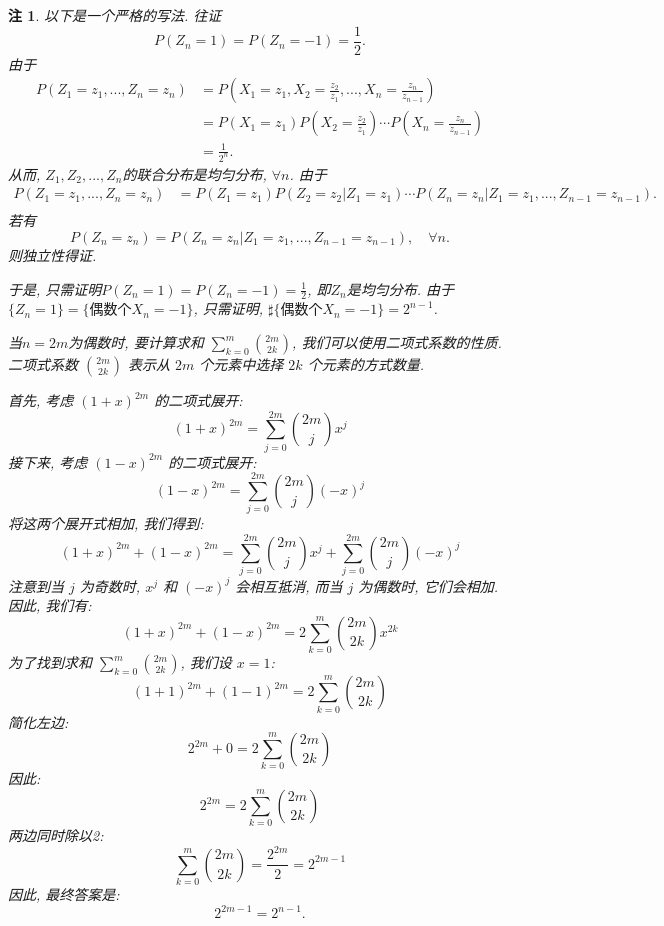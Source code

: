 \documentclass[UTF8, a4paper]{article}
\newtheorem*{remark}{注}
\begin{document}
\begin{remark}
以下是一个严格的写法. 往证
$$
P(Z_n = 1) = P(Z_n = -1) = \frac{1}{2}.
$$
由于
\begin{align*}
P(Z_1 = z_1, ..., Z_n = z_n) &= P\left(X_1 = z_1, X_2 = \frac{z_2}{z_1}, ..., X_n = \frac{z_n}{z_{n-1}}\right) \\
&= P(X_1 = z_1) P\left(X_2 = \frac{z_2}{z_1}\right) \cdots P\left(X_n = \frac{z_n}{z_{n-1}}\right) \\
&= \frac{1}{2^n}.
\end{align*}
从而, \(Z_1, Z_2, ..., Z_n\)的联合分布是均匀分布, \(\forall n\).
由于 
\begin{align*}
P(Z_1 = z_1, ..., Z_n = z_n) &= P(Z_1 = z_1) P(Z_2 = z_2 | Z_1 = z_1) \cdots P(Z_n = z_n | Z_1 = z_1, ..., Z_{n-1} = z_{n-1}). \\
\end{align*}
若有
{\color{blue}
$$
P(Z_n = z_n) = P(Z_n = z_n | Z_1 = z_1, ..., Z_{n-1} = z_{n-1}), \quad \forall n.
$$
}
则独立性得证.

于是, 只需证明\(P(Z_n = 1) = P(Z_n = -1) = \frac{1}{2}\), 即\(Z_n\)是均匀分布.
由于\(\{Z_n = 1\} = \{\text{偶数个} X_n = -1\}\), 只需证明, \(\sharp\{\text{偶数个} X_n = -1\} = 2^{n-1}\). 

当\(n = 2m\)为偶数时, 
要计算求和 \(\sum_{k = 0}^{m} \binom{2m}{2k}\), 我们可以使用二项式系数的性质. 二项式系数 \(\binom{2m}{2k}\) 表示从 \(2m\) 个元素中选择 \(2k\) 个元素的方式数量. 

首先, 考虑 \((1 + x)^{2m}\) 的二项式展开:
\[
(1 + x)^{2m} = \sum_{j=0}^{2m} \binom{2m}{j} x^j
\]
接下来, 考虑 \((1 - x)^{2m}\) 的二项式展开:
\[
(1 - x)^{2m} = \sum_{j=0}^{2m} \binom{2m}{j} (-x)^j
\]
将这两个展开式相加, 我们得到:
\[
(1 + x)^{2m} + (1 - x)^{2m} = \sum_{j=0}^{2m} \binom{2m}{j} x^j + \sum_{j=0}^{2m} \binom{2m}{j} (-x)^j
\]
注意到当 \(j\) 为奇数时, \(x^j\) 和 \((-x)^j\) 会相互抵消, 而当 \(j\) 为偶数时, 它们会相加. 因此, 我们有:
\[
(1 + x)^{2m} + (1 - x)^{2m} = 2 \sum_{k=0}^{m} \binom{2m}{2k} x^{2k}
\]
为了找到求和 \(\sum_{k=0}^{m} \binom{2m}{2k}\), 我们设 \(x = 1\):
\[
(1 + 1)^{2m} + (1 - 1)^{2m} = 2 \sum_{k=0}^{m} \binom{2m}{2k}
\]
简化左边:
\[
2^{2m} + 0 = 2 \sum_{k=0}^{m} \binom{2m}{2k}
\]
因此:
\[
2^{2m} = 2 \sum_{k=0}^{m} \binom{2m}{2k}
\]
两边同时除以2:
\[
\sum_{k=0}^{m} \binom{2m}{2k} = \frac{2^{2m}}{2} = 2^{2m-1}
\]
因此, 最终答案是:
\[
\boxed{2^{2m-1}} = 2^{n-1}.
\]


\end{remark}
\end{document}
